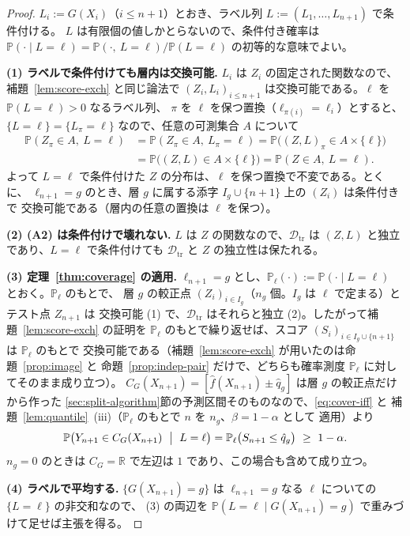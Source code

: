 \documentclass[a4paper,11pt]{jsarticle}
\theoremstyle{definition}
\theoremstyle{plain}
\theoremstyle{remark}
\newcommand{\Prob}{\mathbb{P}}
\newcommand{\Real}{\mathbb{R}}
\newcommand{\Dtr}{\mathcal{D}_{\mathrm{tr}}}     %
\newcommand{\qhat}{\hat{q}}
\newcommand{\fhat}{\hat{f}}
\begin{document}
\begin{proof}
  $L_i:=G(X_i)$（$i\le n+1$）とおき、ラベル列 $L:=(L_1,\dots,L_{n+1})$ で条件付ける。
  $L$ は有限個の値しかとらないので、条件付き確率は
  $\Prob(\cdot\mid L=\ell)=\Prob(\cdot,\ L=\ell)/\Prob(L=\ell)$ の初等的な意味でよい。

  \textbf{(1) ラベルで条件付けても層内は交換可能.}
  $L_i$ は $Z_i$ の固定された関数なので、補題~\ref{lem:score-exch} と同じ論法で
  $(Z_i,L_i)_{i\le n+1}$ は交換可能である。$\ell$ を $\Prob(L=\ell)>0$ なるラベル列、
  $\pi$ を $\ell$ を保つ置換（$\ell_{\pi(i)}=\ell_i$）とすると、$\{L=\ell\}=\{L_\pi=\ell\}$
  なので、任意の可測集合 $A$ について
  \begin{align*}
    \Prob(Z_\pi\in A,\ L=\ell)
    &=\Prob(Z_\pi\in A,\ L_\pi=\ell)
     =\Prob\bigl((Z,L)_\pi\in A\times\{\ell\}\bigr)\\
    &=\Prob\bigl((Z,L)\in A\times\{\ell\}\bigr)
     =\Prob(Z\in A,\ L=\ell).
  \end{align*}
  よって $L=\ell$ で条件付けた $Z$ の分布は、$\ell$ を保つ置換で不変である。とくに、
  $\ell_{n+1}=g$ のとき、層 $g$ に属する添字 $I_g\cup\{n+1\}$ 上の $(Z_i)$ は条件付きで
  交換可能である（層内の任意の置換は $\ell$ を保つ）。

  \textbf{(2) (A2) は条件付けで壊れない.}
  $L$ は $Z$ の関数なので、$\Dtr$ は $(Z,L)$ と独立であり、$L=\ell$ で条件付けても
  $\Dtr$ と $Z$ の独立性は保たれる。

  \textbf{(3) 定理~\ref{thm:coverage} の適用.}
  $\ell_{n+1}=g$ とし、$\Prob_\ell(\cdot):=\Prob(\cdot\mid L=\ell)$ とおく。$\Prob_\ell$ のもとで、
  層 $g$ の較正点 $(Z_i)_{i\in I_g}$（$n_g$ 個。$I_g$ は $\ell$ で定まる）とテスト点 $Z_{n+1}$ は
  交換可能 (1) で、$\Dtr$ はそれらと独立 (2)。したがって補題~\ref{lem:score-exch} の証明を
  $\Prob_\ell$ のもとで繰り返せば、スコア $(S_i)_{i\in I_g\cup\{n+1\}}$ は $\Prob_\ell$ のもとで
  交換可能である（補題~\ref{lem:score-exch} が用いたのは命題~\ref{prop:image} と
  命題~\ref{prop:indep-pair} だけで、どちらも確率測度 $\Prob_\ell$ に対してそのまま成り立つ）。
  $C_G(X_{n+1})=[\fhat(X_{n+1})\pm\qhat_g]$ は層 $g$ の較正点だけから作った
  \ref{sec:split-algorithm}節の予測区間そのものなので、\eqref{eq:cover-iff} と
  補題~\ref{lem:quantile}~(iii)（$\Prob_\ell$ のもとで $n$ を $n_g$、$\beta=1-\alpha$ として
  適用）より
  \begin{equation*}
    \Prob\bigl(Y_{n+1}\in C_G(X_{n+1})\ \bigm|\ L=\ell\bigr)
    =\Prob_\ell\bigl(S_{n+1}\le\qhat_g\bigr)\ \ge\ 1-\alpha .
  \end{equation*}
  $n_g=0$ のときは $C_G=\Real$ で左辺は $1$ であり、この場合も含めて成り立つ。

  \textbf{(4) ラベルで平均する.}
  $\{G(X_{n+1})=g\}$ は $\ell_{n+1}=g$ なる $\ell$ についての $\{L=\ell\}$ の非交和なので、
  (3) の両辺を $\Prob(L=\ell\mid G(X_{n+1})=g)$ で重みづけて足せば主張を得る。
\end{proof}
\end{document}
